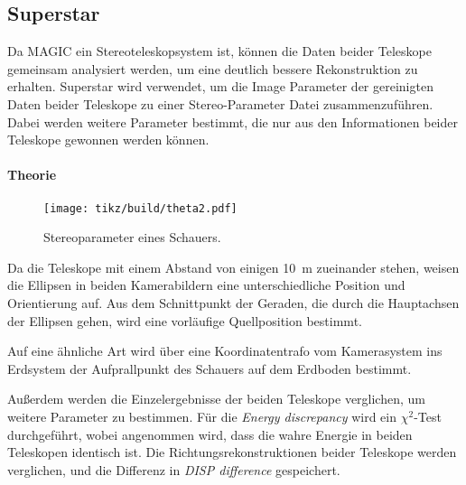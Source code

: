 \subsection{Superstar}%
\label{sub:superstar}

Da MAGIC ein Stereoteleskopsystem ist,
können die Daten beider Teleskope gemeinsam analysiert werden,
um eine deutlich bessere Rekonstruktion zu erhalten.
Superstar wird verwendet,
um die Image Parameter der gereinigten Daten beider
Teleskope zu einer Stereo-Parameter Datei zusammenzuführen.
Dabei werden weitere Parameter bestimmt,
die nur aus den Informationen beider Teleskope gewonnen werden können.

\paragraph{Theorie}%

\begin{wrapfigure}[14]{O}{0.4\textwidth}
  \centering
  \texttt{[image: tikz/build/theta2.pdf]}
  \caption{Stereoparameter eines Schauers.}%
  \label{fig:reco}
\end{wrapfigure}

Da die Teleskope mit einem Abstand von einigen \SI{10}{\meter} zueinander
stehen,
weisen die Ellipsen in beiden Kamerabildern eine unterschiedliche Position und
Orientierung auf.
Aus dem Schnittpunkt der Geraden,
die durch die Hauptachsen der Ellipsen gehen,
wird eine vorläufige Quellposition bestimmt.

Auf eine ähnliche Art wird über eine Koordinatentrafo vom Kamerasystem ins
Erdsystem der Aufprallpunkt des Schauers auf dem Erdboden
bestimmt.


Außerdem werden die Einzelergebnisse der beiden Teleskope verglichen,
um weitere Parameter zu bestimmen.
Für die \textit{Energy discrepancy} wird
ein $\chi^2$-Test durchgeführt,
wobei angenommen wird,
dass die wahre Energie in beiden Teleskopen identisch ist.
Die Richtungsrekonstruktionen beider Teleskope werden verglichen,
und die Differenz in \textit{DISP difference} gespeichert.
